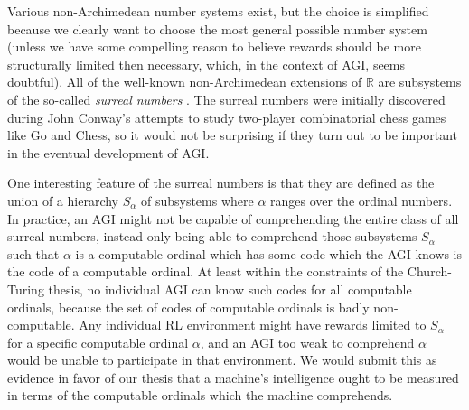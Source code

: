 \documentclass[reqno]{article}
\theoremstyle{definition}
\begin{document}
Various non-Archimedean
number systems exist, but the choice is simplified because we clearly want
to choose the most general possible number system (unless we have
some compelling reason to believe rewards should be more structurally limited
then necessary, which, in the context of AGI, seems doubtful). All of the
well-known non-Archimedean extensions of $\mathbb R$ are subsystems of the
so-called \emph{surreal numbers} \cite{conway} \cite{knuth}. The surreal
numbers were initially discovered during John Conway's attempts to study
two-player combinatorial chess games like Go and Chess, so it would not be
surprising if they turn out to be important in the eventual development of
AGI.


One interesting feature of the surreal numbers is that they are defined as the
union of a hierarchy $S_\alpha$ of subsystems where $\alpha$ ranges over the
ordinal numbers. In practice, an AGI might not be capable of comprehending the
entire class of all surreal numbers, instead only being able to comprehend those
subsystems $S_\alpha$ such that $\alpha$ is a computable ordinal which has some
code which the AGI knows is the code of a computable ordinal. At least within the
constraints of the Church-Turing thesis, no individual AGI can know such codes
for all computable ordinals, because the set of codes of computable ordinals is
badly non-computable. Any individual RL environment might have rewards limited
to $S_\alpha$ for a specific computable ordinal $\alpha$, and an AGI too weak to
comprehend $\alpha$ would be unable to participate in that environment. We would
submit this as evidence in favor of our thesis \cite{alexander2019measuring} that
a machine's
intelligence ought to be measured in terms of the computable ordinals which the
machine comprehends.
\end{document}
